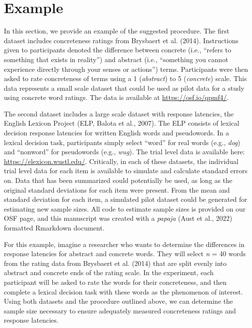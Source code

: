\documentclass[
  man]{apa7}
\begin{document}
\hypertarget{example}{%
\section{Example}\label{example}}

In this section, we provide an example of the suggested procedure. The first dataset includes concreteness ratings from Brysbaert et al. (2014). Instructions given to participants denoted the difference between concrete (i.e., ``refers to something that exists in reality'') and abstract (i.e., ``something you cannot experience directly through your senses or actions'') terms. Participants were then asked to rate concreteness of terms using a 1 (\emph{abstract}) to 5 (\emph{concrete}) scale. This data represents a small scale dataset that could be used as pilot data for a study using concrete word ratings. The data is available at \url{https://osf.io/qpmf4/}.

The second dataset includes a large scale dataset with response latencies, the English Lexicon Project (ELP, Balota et al., 2007). The ELP consists of lexical decision response latencies for written English words and pseudowords. In a lexical decision task, participants simply select ``word'' for real words (e.g., \emph{dog}) and ``nonword'' for pseudowords (e.g., \emph{wug}). The trial level data is available here: \url{https://elexicon.wustl.edu/}. Critically, in each of these datasets, the individual trial level data for each item is available to simulate and calculate standard errors on. Data that has been summarized could potentially be used, as long as the original standard deviations for each item were present. From the mean and standard deviation for each item, a simulated pilot dataset could be generated for estimating new sample sizes. All code to estimate sample sizes is provided on our OSF page, and this manuscript was created with a \emph{papaja} (Aust et al., 2022) formatted Rmarkdown document.

For this example, imagine a researcher who wants to determine the differences in response latencies for abstract and concrete words. They will select \emph{n} = 40 words from the rating data from Brysbaert et al. (2014) that are split evenly into abstract and concrete ends of the rating scale. In the experiment, each participant will be asked to rate the words for their concreteness, and then complete a lexical decision task with these words as the phenomenon of interest. Using both datasets and the procedure outlined above, we can determine the sample size necessary to ensure adequately measured concreteness ratings and response latencies.
\end{document}
